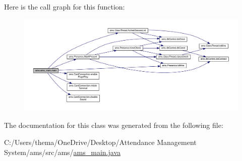 Here is the call graph for this function\+:\nopagebreak
\begin{figure}[H]
\begin{center}
\leavevmode
\includegraphics[width=350pt]{classams_1_1ams__main_a74752faba16c8957221a224d97558e10_cgraph}
\end{center}
\end{figure}


The documentation for this class was generated from the following file\+:\begin{DoxyCompactItemize}
\item 
C\+:/\+Users/thema/\+One\+Drive/\+Desktop/\+Attendance Management System/ams/src/ams/\mbox{\hyperlink{ams__main_8java}{ams\+\_\+main.\+java}}\end{DoxyCompactItemize}
